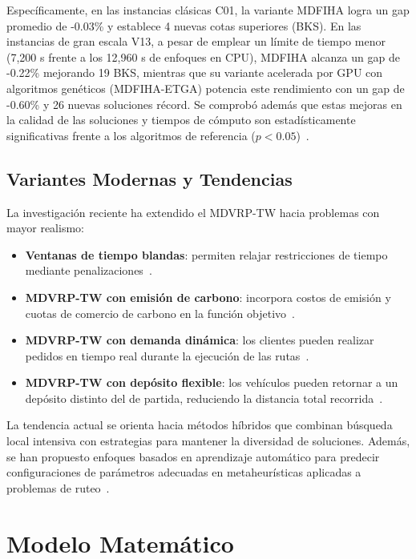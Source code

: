 \documentclass[letter, 10pt, dvipdfmx]{article}
\begin{document}
Específicamente, en las instancias clásicas C01, la variante MDFIHA logra un gap promedio de -0.03\% y establece 4 nuevas cotas
superiores (BKS). En las instancias de gran escala V13, a pesar de emplear un límite de tiempo menor
(7,200 s frente a los 12,960 s de enfoques en CPU), MDFIHA alcanza un gap de -0.22\% mejorando 19 BKS,
mientras que su variante acelerada por GPU con algoritmos genéticos (MDFIHA-ETGA) potencia este rendimiento con un gap de -0.60\% y 26 nuevas
soluciones récord. Se comprobó además que estas mejoras en la calidad de las soluciones y tiempos de cómputo son
estadísticamente significativas frente a los algoritmos de referencia ($p < 0.05$)~\cite{GPU2026}.

\subsection{Variantes Modernas y Tendencias}

La investigación reciente ha extendido el MDVRP-TW hacia problemas con mayor realismo:
\begin{itemize}
  \item \textbf{Ventanas de tiempo blandas}: permiten relajar restricciones de tiempo mediante penalizaciones~\cite{Li2024}.
  \item \textbf{MDVRP-TW con emisión de carbono}: incorpora costos de emisión y cuotas de comercio de carbono en la función objetivo~\cite{Carbon2018}.
  \item \textbf{MDVRP-TW con demanda dinámica}: los clientes pueden realizar pedidos en tiempo real durante la ejecución de las rutas~\cite{Wang2024}.
  \item \textbf{MDVRP-TW con depósito flexible}: los vehículos pueden retornar a un depósito distinto del de partida, reduciendo la distancia total recorrida~\cite{Springer2014}.
\end{itemize}

La tendencia actual se orienta hacia métodos híbridos que combinan búsqueda local intensiva con estrategias
para mantener la diversidad de soluciones. Además, se han propuesto enfoques basados en aprendizaje automático para predecir configuraciones de parámetros
adecuadas en metaheurísticas aplicadas a problemas de ruteo~\cite{MLparams2025}.

\section{Modelo Matemático}
\end{document}
